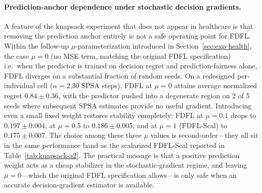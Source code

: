 \documentclass[ijoc,sglanonrev]{informs4}
\begin{document}
\paragraph{Prediction-anchor dependence under stochastic decision gradients.}
A feature of the knapsack experiment that does not appear in healthcare
is that removing the prediction anchor entirely is not a safe operating
point for FDFL. Within the follow-up $\mu$-parameterization introduced in Section~\ref{sec:exp-health}, the case $\mu = 0$ (no MSE term, matching the original FDFL specification) i.e.\ when
the predictor is trained on decision regret and prediction-fairness
alone, FDFL diverges on a substantial fraction of random seeds. On a
redesigned per-individual cell ($\alpha = 2$,30 SPSA steps), FDFL at $\mu = 0$ attains
average normalized regret $0.84 \pm 0.36$, with the predictor pushed
into a degenerate region on 2 of 5 seeds where subsequent SPSA
estimates provide no useful gradient. Introducing even a small fixed
weight restores stability completely: FDFL at $\mu = 0.1$ drops to
$0.197 \pm 0.004$, at $\mu = 0.5$ to $0.186 \pm 0.005$, and at
$\mu = 1$ (FDFL-Scal) to $0.175 \pm 0.007$. The choice among these
three $\mu$ values is second-order---they all sit in the same
performance band as the scalarized FDFL-Scal reported in
Table~\ref{tab:knapsack-a2}. The practical message is that a positive
prediction weight acts as a cheap stabilizer in the stochastic-gradient
regime, and leaving $\mu = 0$---which the original FDFL specification
allows---is only safe when an accurate decision-gradient estimator is
available.
\end{document}
